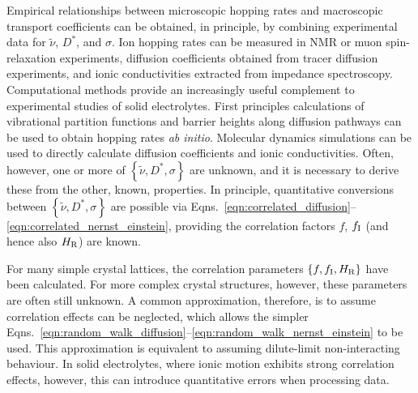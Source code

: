 \documentclass[aps,prb,twocolumn,superscriptaddress,reprint]{revtex4-1}
\newcommand{\set}[1]{\left\{#1\right\}}
\newcommand{\hrpa}{{\widetilde{\nu}}}
\begin{document}
Empirical relationships between microscopic hopping rates and macroscopic transport coefficients can be obtained, in principle, by combining experimental data for $\hrpa$, $D^*$, and $\sigma$. 
Ion hopping rates can be measured in NMR or muon spin-relaxation experiments,\cite{WilkeningEtAl_PhysRevLett2006, RuprechtEtAl_PhysChemChemPhys2012, Enciso-MaldonadoEtAl_ChemMater2015,Santibanez-MendietaEtAl_ChemMater2016, NozakiEtAl_SolStatIonics2014,AmoresEtAl_JMaterChemA2016} diffusion coefficients obtained from tracer diffusion experiments,\cite{BaylissEtAl_AdvEnergyMater2014} and ionic conductivities extracted from impedance spectroscopy.\cite{ZeierEtAl_ACSApplMaterInt2014,Lopez-BermudezEtAl_2016} Computational methods provide an increasingly useful complement to experimental studies of solid electrolytes. 
First principles calculations of vibrational partition functions and barrier heights along diffusion pathways can be used to obtain hopping rates \emph{ab initio}.\cite{VanDerVenEtAl_PhysRevB2001, MantinaEtAl_PhysRevLett2008} Molecular dynamics simulations can be used to directly calculate diffusion coefficients and ionic conductivities.\cite{MorganAndMadden_JPhysCondensMat2012} Often, however, one or more of $\set{\hrpa,D^*,\sigma}$ are unknown, and it is necessary to derive these from the other, known, properties. In principle, quantitative conversions between $\set{\hrpa,D^*,\sigma}$ are possible via Eqns.~\ref{eqn:correlated_diffusion}--\ref{eqn:correlated_nernst_einstein}, providing the correlation factors $f$, $f_{\mathrm{I}}$ (and hence also $H_{\mathrm{R}}$) are known.

For many simple crystal lattices, the correlation parameters $\set{f, f_\m{I}, H_\m{R}}$ have been calculated.\cite{Friauf_JApplPhys1962,Murch_SolStatIonics1982} For more complex crystal structures, however, these parameters are often still unknown. A common approximation, therefore, is to assume correlation effects can be neglected, which allows the simpler Eqns.~\ref{eqn:random_walk_diffusion}--\ref{eqn:random_walk_nernst_einstein} to be used. This approximation is equivalent to assuming dilute-limit non-interacting behaviour. In solid electrolytes, where ionic motion exhibits strong correlation effects, however, this can introduce quantitative errors when processing data.
\end{document}
